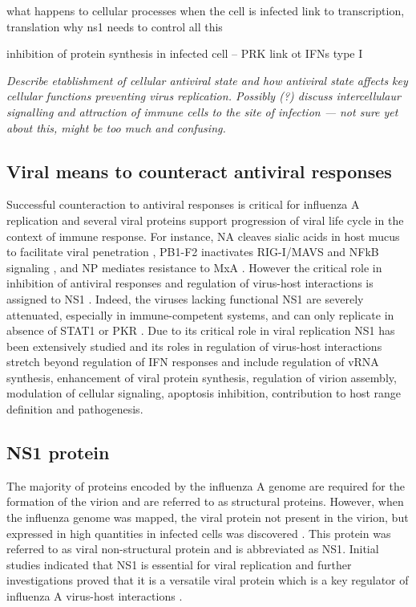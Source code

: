 		what happens to cellular processes when the cell is infected
		link to transcription, translation 
		why ns1 needs to control all this
		
	
		inhibition of protein synthesis in infected cell -- PRK link ot IFNs type I
		
		\textit{Describe etablishment of cellular antiviral state and how antiviral state affects key cellular functions preventing virus replication. Possibly (?) discuss intercellulaur signalling and attraction of immune cells to the site of infection --- not sure yet about this, might be too much and confusing.}
		
	\subsection{Viral means to counteract antiviral responses}
	
	Successful counteraction to antiviral responses is critical for influenza A replication and several viral proteins support progression of viral life cycle in the context of immune response. For instance, \gls{NA} cleaves sialic acids in host mucus to facilitate viral penetration \parencite{Cohen2013}, \gls{PB1}-F2 inactivates \gls{RIG-I}/\gls{MAVS} and \gls{NFkB} signaling \parencite{Varga2011a, Dudek2011, Reis2013}, and \gls{NP} mediates resistance to \gls{MxA} \parencite{Dittmann2008}. However the critical role in inhibition of antiviral responses and regulation of virus-host interactions is assigned to \gls{NS1} \parencite{Garcia-Sastre1998}. Indeed, the viruses lacking functional \gls{NS1} are severely attenuated, especially in immune-competent systems, and can only replicate in absence of \gls{STAT}1 or \gls{PKR} \parencite{Egorov1998, Donelan2003, Garcia-Sastre1998}. Due to its critical role in viral replication \gls{NS1} has been extensively studied and its roles in regulation of virus-host interactions stretch beyond regulation of \gls{IFN} responses and include regulation of vRNA synthesis, enhancement of viral protein synthesis, regulation of virion assembly, modulation of cellular signaling, apoptosis inhibition, contribution to host range definition and pathogenesis. 
		
	\subsection{NS1 protein}
		
		The majority of proteins encoded by the influenza A genome are required for the formation of the virion and are referred to as structural proteins. However, when the influenza genome was mapped, the viral protein not present in the virion, but expressed in high quantities in infected cells was discovered \parencite{Ritchey1976}. This protein was referred to as viral non-structural protein and is abbreviated as \gls{NS1}. Initial studies indicated that \gls{NS1} is essential for viral replication \parencite{Koennecke1981} and further investigations proved that it is a versatile viral protein which is a key regulator of influenza A virus-host interactions \parencite{Ayllon2015}.
		
